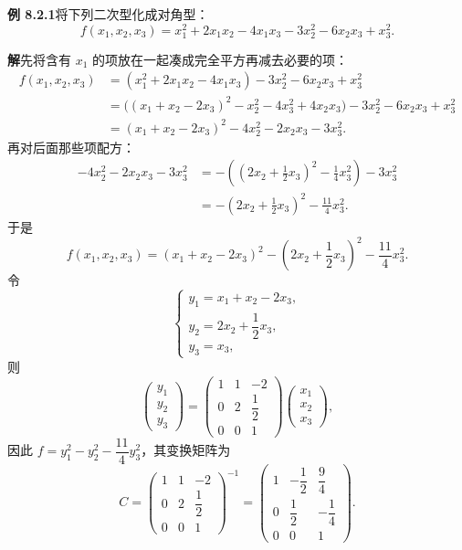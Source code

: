 \documentclass[UTF8, 12pt, fontset=fandol, oneside]{ctexart}
\begin{document}
\noindent\textbf{例 8.2.1}\quad 将下列二次型化成对角型：
\[
f(x_1,x_2,x_3)=x_1^2+2x_1x_2-4x_1x_3-3x_2^2-6x_2x_3+x_3^2.
\]

\noindent\textbf{解}\quad 先将含有 $x_1$ 的项放在一起凑成完全平方再减去必要的项：
\[
\begin{aligned}
f(x_1,x_2,x_3)
&=(x_1^2+2x_1x_2-4x_1x_3)-3x_2^2-6x_2x_3+x_3^2\\
&=\bigl((x_1+x_2-2x_3)^2-x_2^2-4x_3^2+4x_2x_3\bigr)-3x_2^2-6x_2x_3+x_3^2\\
&=(x_1+x_2-2x_3)^2-4x_2^2-2x_2x_3-3x_3^2.
\end{aligned}
\]
再对后面那些项配方：
\[
\begin{aligned}
-4x_2^2-2x_2x_3-3x_3^2
&=-\left(\left(2x_2+\frac12x_3\right)^2-\frac14x_3^2\right)-3x_3^2\\
&=-\left(2x_2+\frac12x_3\right)^2-\frac{11}{4}x_3^2.
\end{aligned}
\]
于是
\[
f(x_1,x_2,x_3)=(x_1+x_2-2x_3)^2-\left(2x_2+\frac12x_3\right)^2-\frac{11}{4}x_3^2.
\]
令
\[
\left\{\begin{array}{l}
y_1=x_1+x_2-2x_3,\\
y_2=2x_2+\dfrac12x_3,\\
y_3=x_3,
\end{array}\right.
\]
则
\[
\left(\begin{array}{c}
y_1\\
y_2\\
y_3
\end{array}\right)
=
\left(\begin{array}{ccc}
1&1&-2\\
0&2&\dfrac12\\
0&0&1
\end{array}\right)
\left(\begin{array}{c}
x_1\\
x_2\\
x_3
\end{array}\right),
\]
因此 $f=y_1^2-y_2^2-\dfrac{11}{4}y_3^2$，其变换矩阵为
\[
C=
\left(\begin{array}{ccc}
1&1&-2\\
0&2&\dfrac12\\
0&0&1
\end{array}\right)^{-1}
=
\left(\begin{array}{ccc}
1&-\dfrac12&\dfrac94\\
0&\dfrac12&-\dfrac14\\
0&0&1
\end{array}\right).
\]
\end{document}
